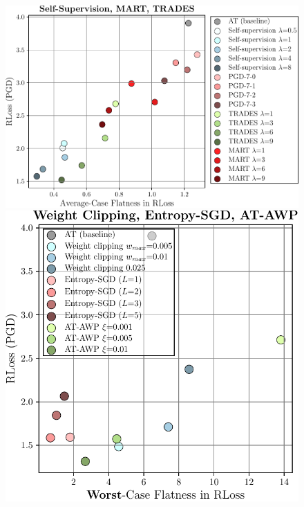 \begin{figure}[t]
\begin{minipage}{\textwidth}
\begin{minipage}[t]{0.26\textwidth}
		\includegraphics[width=1\textwidth]{plots_supp_flatness_correlation_seq_loss_methods_at}
	\end{minipage}
	\begin{minipage}[t]{0.01\textwidth}
		\vspace*{0px}
		
		\hspace*{4px}{\color{black!75}\rule{0.65px}{3.15cm}}
	\end{minipage}
	\begin{minipage}[t]{0.18\textwidth}
		\vspace*{0px}
				 
		\includegraphics[width=1\textwidth]{plots_supp_flatness_correlation_joint_loss_methods_flat}
	\end{minipage}


\end{minipage}
\end{figure}
